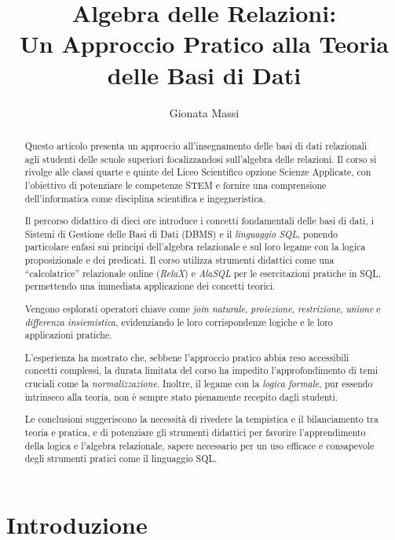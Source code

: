 \documentclass[withtimes]{easychair}
\title{Algebra delle Relazioni:\\Un Approccio Pratico alla Teoria delle Basi di Dati}
\author{
Gionata Massi%
}
\institute{
   Istituto di Istruzione Superiore Savoia Benincasa\\
   Ancona, Italia\\
   \email{gionata.massi@savoiabenincasa.it}
}
\theoremstyle{definition}
\begin{document}
\maketitle


\begin{abstract}
Questo articolo presenta un approccio all'insegnamento delle basi di dati relazionali agli studenti delle scuole superiori focalizzandosi sull'algebra delle relazioni. Il corso si rivolge alle classi quarte e quinte del Liceo Scientifico opzione Scienze Applicate, con l'obiettivo di potenziare le competenze STEM e fornire una comprensione  dell'informatica come disciplina scientifica e ingegneristica.

Il percorso didattico di dieci ore introduce i concetti fondamentali delle basi di dati, i Sistemi di Gestione delle Basi di Dati (DBMS) e il \emph{linguaggio SQL}, ponendo particolare enfasi sui principi dell'algebra relazionale e sul loro legame con la logica proposizionale e dei predicati. Il corso utilizza strumenti didattici come una ``calcolatrice'' relazionale online (\emph{RelaX}) e \emph{AlaSQL} per le esercitazioni pratiche in SQL, permettendo una immediata applicazione dei concetti teorici.

Vengono esplorati operatori chiave come \emph{join naturale}, \emph{proiezione}, \emph{restrizione}, \emph{unione} e \emph{differenza insiemistica}, evidenziando le loro corrispondenze logiche e le loro applicazioni pratiche.

L'esperienza ha mostrato che, sebbene l'approccio pratico abbia reso accessibili concetti complessi, la durata  limitata del corso ha impedito l'approfondimento di temi cruciali come la \emph{normalizzazione}. Inoltre, il legame con la \emph{logica formale}, pur essendo intrinseco alla teoria, non è sempre stato pienamente recepito dagli studenti.

Le conclusioni suggeriscono la necessità di rivedere la tempistica e il bilanciamento tra teoria e pratica, e di potenziare gli strumenti didattici per favorire l'apprendimento  della logica e l'algebra relazionale, sapere necessario per un uso efficace e consapevole degli strumenti pratici come il linguaggio SQL.
\end{abstract}

\section{Introduzione}\label{introduzione}
\end{document}
